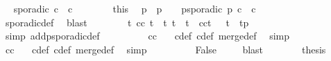 \begin{isabellebody}
\ \isamarkupfalse%
\ {\isacartoucheopen}sporadic\ {\isacharparenleft}c\ {\isasymoplus}\ c{\isacharprime}{\isacharparenright}{\isacartoucheclose}\isanewline
\ \ \ \ \ \ \isamarkupfalse%
\ this\ \isamarkupfalse%
\ p\ \ {\isacharasterisk}{\isacharcolon}{\isacartoucheopen}p\ {\isachargreater}\ {}{\isacartoucheclose}\ \ {\isacartoucheopen}p{\isacharunderscore}sporadic\ p\ {\isacharparenleft}c\ {\isasymoplus}\ c{\isacharprime}{\isacharparenright}{\isacartoucheclose}\isanewline
\ \ \ \ \ \ \ \ \isamarkupfalse%
\ sporadic{\isacharunderscore}def\ \isamarkupfalse%
\ blast\isanewline
\ \ \ \ \ \ \isamarkupfalse%
\ {\isacartoucheopen}{\isasymforall}t{\isachardot}\ {\isacharparenleft}c{\isasymoplus}c{\isacharprime}{\isacharparenright}\ t\ {\isasymlongrightarrow}\ {\isacharparenleft}{\isasymforall}t{\isacharprime}{\isachardot}\ {\isacharparenleft}t\ {\isacharless}\ t{\isacharprime}\ {\isasymand}\ {\isacharparenleft}c{\isasymoplus}c{\isacharprime}{\isacharparenright}t{\isacharprime}{\isacharparenright}\ {\isasymlongrightarrow}\ \ t{\isacharprime}\ {\isachargreater}\ t{\isacharplus}p{\isacharparenright}{\isacartoucheclose}\isanewline
\ \ \ \ \ \ \ \ \isamarkupfalse%
\ {\isacharparenleft}simp\ add{\isacharcolon}p{\isacharunderscore}sporadic{\isacharunderscore}def{\isacharparenright}\isanewline
\ \ \ \ \ \ \isamarkupfalse%
\ \isamarkupfalse%
\ {\isacartoucheopen}{\isacharparenleft}c{\isasymoplus}c{\isacharprime}{\isacharparenright}\ {}{\isacartoucheclose}\ \isamarkupfalse%
\ c{\isacharunderscore}def\ c{\isacharprime}{\isacharunderscore}def\ merge{\isacharunderscore}def\ \isamarkupfalse%
\ simp\isanewline
\ \ \ \ \ \ \isamarkupfalse%
\ \isamarkupfalse%
\ {\isacartoucheopen}{\isacharparenleft}c{\isasymoplus}c{\isacharprime}{\isacharparenright}\ {}{\isacartoucheclose}\ \isamarkupfalse%
\ c{\isacharunderscore}def\ c{\isacharprime}{\isacharunderscore}def\ merge{\isacharunderscore}def\ \isamarkupfalse%
\ simp\isanewline
\ \ \ \ \ \ \isamarkupfalse%
\ \isamarkupfalse%
\ False\ \isamarkupfalse%
\ {\isacharasterisk}\ \isamarkupfalse%
\ blast\isanewline
\ \ \ \ \isacommand{{\isacharbraceright}}\isamarkupfalse%
\ \isamarkupfalse%
\ {\isacharquery}thesis\ \isacommand{{\isachardot}{\isachardot}}\isamarkupfalse%

\end{isabellebody}
